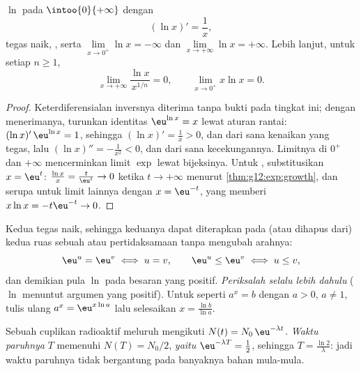 \begin{proposition}\label{prop:g12:exp:lnanalytic}
 $\ln$  pada $\intoo{0}{+\infty}$ dengan
\[
(\ln x)' = \frac{1}{x},
\]
tegas naik, , serta
$\lim\limits_{x\to0^+} \ln x = -\infty$ dan
$\lim\limits_{x\to+\infty} \ln x = +\infty$. Lebih lanjut, untuk setiap
 $n \geq 1$,
\[
\lim_{x\to+\infty} \frac{\ln x}{x^{1/n}} = 0, \qquad
\lim_{x\to0^+} x \ln x = 0 .
\]
\end{proposition}

\begin{proof}
Keterdiferensialan  inversnya diterima tanpa bukti pada tingkat ini;
dengan menerimanya, turunkan identitas $\eu^{\ln x} = x$ lewat aturan rantai:
$(\ln x)'\,\eu^{\ln x} = 1$, sehingga $(\ln x)' = \frac{1}{x} > 0$, dan dari
sana kenaikan yang tegas, lalu $(\ln x)'' = -\frac1{x^2} < 0$, dan dari sana
kecekungannya. Limitnya di $0^+$ dan $+\infty$ mencerminkan limit $\exp$
lewat bijeksinya. Untuk , substitusikan
$x = \eu^{t}$: $\frac{\ln x}{x} = \frac{t}{\eu^t} \to 0$ ketika
$t \to +\infty$ menurut \cref{thm:g12:exp:growth}, dan serupa untuk limit
lainnya dengan $x = \eu^{-t}$, yang memberi $x\ln x = -t\eu^{-t} \to 0$.
\end{proof}

\begin{method}\label{met:g12:exp:equations}
Kedua  tegas naik, sehingga keduanya dapat diterapkan pada (atau
dihapus dari) kedua ruas sebuah  atau pertidaksamaan tanpa mengubah arahnya:
\[
\eu^{u} = \eu^{v} \iff u = v, \qquad
\eu^{u} \leq \eu^{v} \iff u \leq v,
\]
dan demikian pula $\ln$ pada besaran yang positif. \emph{Periksalah selalu
 lebih dahulu} ($\ln$ menuntut argumen yang positif). Untuk
 seperti $a^x = b$ dengan $a>0$, $a \neq 1$, tulis ulang
$a^x = \eu^{x\ln a}$ lalu selesaikan $x = \frac{\ln b}{\ln a}$.
\end{method}

\begin{example}\label{ex:g12:exp:halflife}
Sebuah cuplikan radioaktif meluruh mengikuti $N(t) = N_0\,\eu^{-\lambda t}$.
\emph{Waktu paruhnya} $T$ memenuhi $N(T) = N_0/2$, \emph{yaitu}
$\eu^{-\lambda T} = \frac12$, sehingga $T = \frac{\ln 2}{\lambda}$: jadi waktu
paruhnya tidak bergantung pada banyaknya bahan mula-mula.
\end{example}

